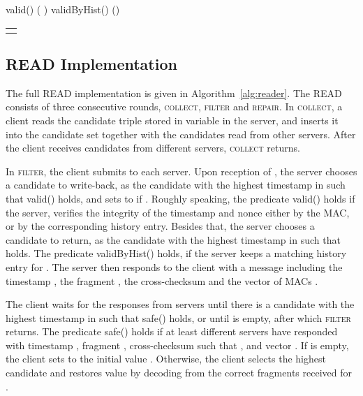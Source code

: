 \documentclass[10pt,conference,compsocconf]{IEEEtran}
\newcommand{\mprotocol}{M-PoWerStore}
\begin{document}
\begin{algo*}[t]
\begin{minipage}[t]{0.56\textwidth}
\begin{distribalgo}[1]
\medskip
{}
\STATE \textsf{valid}()  (  ) \label{alg2:server:valid-pred}
\STATE \textsf{validByHist}()  ()
\ENDINDENT

\setcounter{alg:client1:lines}{\value{ALC@line}}
\end{distribalgo}

\end{minipage}

\begin{tabular}{c}\hline\mbox{}\hspace{0.97\textwidth}\mbox{}\end{tabular}
\vspace{-1 em}
\caption{{Algorithm of server  in \mprotocol.}}\label{alg2:server}
\end{algo*}


\subsection{\textsc{READ} Implementation}
The full \textsc{READ} implementation is given in Algorithm~\ref{alg:reader}.
The \textsc{READ} consists of three consecutive rounds, \textsc{collect}, \textsc{filter} and \textsc{repair}. In \textsc{collect}, a client reads the candidate triple  stored in variable  in the server, and inserts it into the candidate set  together with the candidates read from other servers. After the client receives  candidates from different servers, \textsc{collect} returns.

In \textsc{filter}, the client submits  to each server. Upon reception of , the server chooses a candidate  to write-back, as the candidate with the highest timestamp in  such that \textsf{valid}() holds, and sets  to  if . Roughly speaking, the predicate \textsf{valid}() holds if the server, verifies the integrity of the timestamp  and nonce  either by the MAC, or by the corresponding history entry. Besides that, the server chooses a candidate  to return, as the candidate with the highest timestamp in  such that  holds. The predicate \textsf{validByHist}() holds, if the server keeps a matching history entry for . The server then responds to the client with a message including the timestamp , the fragment , the cross-checksum  and the vector of MACs .

The client waits for the responses from servers until there is a candidate  with the highest timestamp in  such that \textsf{safe}() holds, or until  is empty, after which \textsc{filter} returns. The predicate \textsf{safe}() holds if at least  different servers  have responded with timestamp , fragment ,  cross-checksum  such that , and vector .
If  is empty, the client sets  to the initial value . Otherwise, the client selects the highest candidate  and restores value  by decoding  from the  correct fragments received for .
\end{document}
